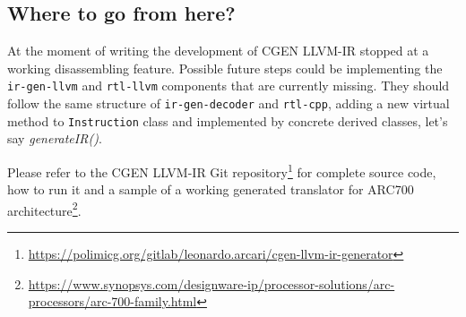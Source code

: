 \documentclass{article}
\begin{document}
\subsection{Where to go from here?}
At the moment of writing the development of CGEN LLVM-IR stopped at a working disassembling feature. Possible future steps could be implementing the \texttt{ir-gen-llvm} and \texttt{rtl-llvm} components that are currently missing. They should follow the same structure of \texttt{ir-gen-decoder} and \texttt{rtl-cpp}, adding a new virtual method to \texttt{Instruction} class and implemented by concrete derived classes, let's say \emph{generateIR()}.

Please refer to the CGEN LLVM-IR Git repository\footnote{\url{https://polimicg.org/gitlab/leonardo.arcari/cgen-llvm-ir-generator}} for complete source code, how to run it and a sample of a working generated translator for ARC700 architecture\footnote{\url{https://www.synopsys.com/designware-ip/processor-solutions/arc-processors/arc-700-family.html}}.
\end{document}
